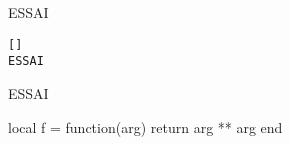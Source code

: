\def\FVE@CDRBlock {
  \FV@VerbatimEnd
  \bool_if:NT \l_CDR_pygments_bool {
    \lua_now:n { CDR:hilight_code() }
  }
  \group_end:
  \@esphack
}
\ExplSyntaxOff
\makeatother
{}
ESSAI
\begin{Verbatim}
[]
ESSAI
\end{Verbatim}
\begin{MyVerbatim}[fontsize=\Large]
ESSAI
\end{MyVerbatim}
\begin{CDRBlock} [
  tags=,
  fontfamily=menlo,
  fontsize=\Large,
  pygments=false,
  lang=lua,
  numbers=left,
  frame=lines,
]
local f = function(arg)
  return arg ** arg
end
\end{CDRBlock}

\egroup
{}
